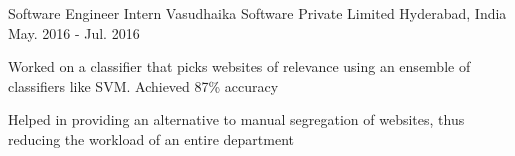 \begin{cventries}
  \cventry
    {Software Engineer Intern } %
    {Vasudhaika Software Private Limited} %
    {Hyderabad, India} %
    {May. 2016 - Jul. 2016} %
    {
      \begin{cvitems} %
      \item {Worked on a classifier that picks websites of relevance using an ensemble of classifiers like SVM. Achieved 87\% accuracy}
      \item {Helped in providing an alternative to manual segregation of websites, thus reducing the workload of an entire department}
      \end{cvitems}
    }

\end{cventries}
